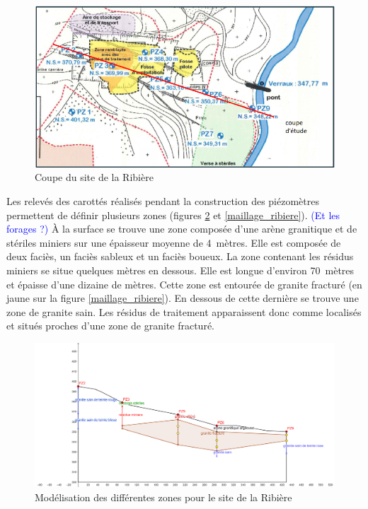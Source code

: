 \documentclass{article}
\newcommand{\blue}[1]{\textcolor{blue}{#1}} %
\begin{document}
\begin{figure}[H]
    \centering
    \includegraphics[width =\textwidth]{III_B_3_2.png} 
    \caption{Coupe du site de la Ribière}
    \label{fig:coupe_site_ribiere}
\end{figure}

Les relevés des carottés réalisés pendant la construction des piézomètres permettent de définir plusieurs zones (figures \ref{fig:zones_ribieres_geogebra} et \ref{maillage_ribiere}). \blue{(Et les forages ?)} À la surface se trouve une zone composée d’une arène granitique et de stériles miniers sur une épaisseur moyenne de 4~mètres. Elle est composée de deux faciès, un faciès sableux et un faciès boueux. La zone contenant les résidus miniers se situe quelques mètres en dessous. Elle est longue d'environ 70~mètres et épaisse d'une dizaine de mètres. Cette zone est entourée de granite fracturé (en jaune sur la figure \ref{maillage_ribiere}). En dessous de cette dernière se trouve une zone de granite sain. Les résidus de traitement apparaissent donc comme localisés et situés proches d’une zone de granite fracturé.

\begin{figure}[H]
    \centering
    \includegraphics[width=0.8\linewidth]{III_B_3_3.png}
    \caption{Modélisation  des différentes zones pour le site de la Ribière}
    \label{fig:zones_ribieres_geogebra}
\end{figure}
\end{document}
